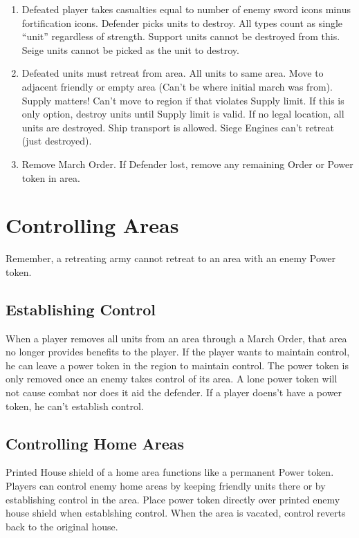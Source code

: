 \documentclass[10pt]{article}
\newenvironment{enumerateCustom}
{\begin{enumerate}
  \setlength{\itemsep}{1pt}
  \setlength{\parskip}{0pt}
  \setlength{\parsep}{0pt}}
{\end{enumerate}}
\begin{document}
\begin{multicols*}{2}
\begin{enumerateCustom}
\begin{enumerateCustom}
		\item Defeated player takes casualties equal to number of enemy sword icons minus fortification icons. Defender picks units to destroy. All types count as single ``unit'' regardless of strength. Support units cannot be destroyed from this. Seige units cannot be picked as the unit to destroy.
		\item Defeated units must retreat from area. All units to same area. Move to adjacent friendly or empty area (Can't be where initial march was from). Supply matters! Can't move to region if that violates Supply limit. If this is only option, destroy units until Supply limit is valid. If no legal location, all units are destroyed. Ship transport is allowed. Siege Engines can't retreat (just destroyed).
		\item Remove March Order. If Defender lost, remove any remaining Order or Power token in area.
	\end{enumerateCustom}
\end{enumerateCustom}

\section*{Controlling Areas}
Remember, a retreating army cannot retreat to an area with an enemy Power token.
\subsection*{Establishing Control}
When a player removes all units from an area through a March Order, that area no longer provides benefits to the player. If the player wants to maintain control, he can leave a power token in the region to maintain control. The power token is only removed once an enemy takes control of its area. A lone power token will not cause combat nor does it aid the defender. If a player doens't have a power token, he can't establish control.
\subsection*{Controlling Home Areas}
Printed House shield of a home area functions like a permanent Power token. Players can control enemy home areas by keeping friendly units there or by establishing control in the area. Place power token directly over printed enemy house shield when establshing control. When the area is vacated, control reverts back to the original house.


\end{multicols*}
\end{document}
